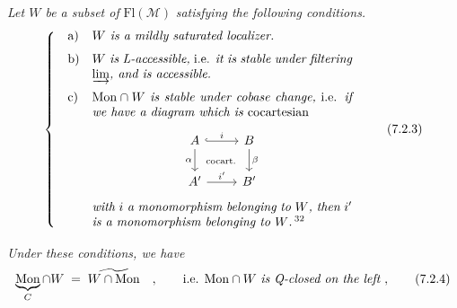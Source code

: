 \documentclass[11pt]{article}
\newcommand{\msp}[1]{\marginpar{\footnotesize [#1]}}
\newcommand{\M}{\mathcal{M}}
\newcommand{\Mon}{\mathrm{Mon}}
\newcommand{\Fl}{\mathrm{Fl}}
\begin{document}
\textit{Let $W$ be a subset of} $\Fl(\M)$ \textit{satisfying the following conditions.}
\[
\left\{
\begin{array}{@{\quad}l@{\quad}p{0.6\textwidth}}
\text{a)} & \textit{$W$ is a mildly saturated localizer.} \\[1.5ex]
\text{b)} & \textit{$W$ is L-accessible,} i.e. \textit{it is stable under filtering $\varinjlim$, and is accessible.} \\[1.5ex]
\text{c)} & $\Mon \cap W$ \textit{is stable under cobase change,} i.e. \textit{if we have a diagram which is} cocartesian
\begin{center}
\begin{tikzcd}[ampersand replacement=\&]
A \arrow[r, hook, "i"] \arrow[d, "\alpha"'] \arrow[dr, phantom, "\scriptstyle\text{cocart.}"] \& B \arrow[d, "\beta"] \\
A' \arrow[r, "i'"] \& B'
\end{tikzcd}
\end{center}
\textit{with $i$ a monomorphism belonging to $W$, then $i'$ is a monomorphism belonging to $W$.}\,\footnotemark[32]
\end{array}
\right.
\tag*{(7.2.3)}
\]

\msp{page 89}
\textit{Under these conditions, we have}
\[
\underbrace{\Mon}_{C} \cap W \;=\; \widetilde{W \cap \Mon} \quad , \qquad \text{i.e. } \Mon \cap W \text{ \textit{is Q-closed on the left}} \;,
\tag*{(7.2.4)}
\]
\end{document}
